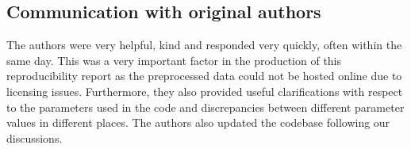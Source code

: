 \subsection{Communication with original authors}

The authors were very helpful, kind and responded very quickly, often within the same day. This was a very important factor in the production of this reproducibility report as the preprocessed data could not be hosted online due to licensing issues. Furthermore, they also provided useful clarifications with respect to the parameters used in the code and discrepancies between different parameter values in different places. The authors also updated the codebase following our discussions.

%
%


